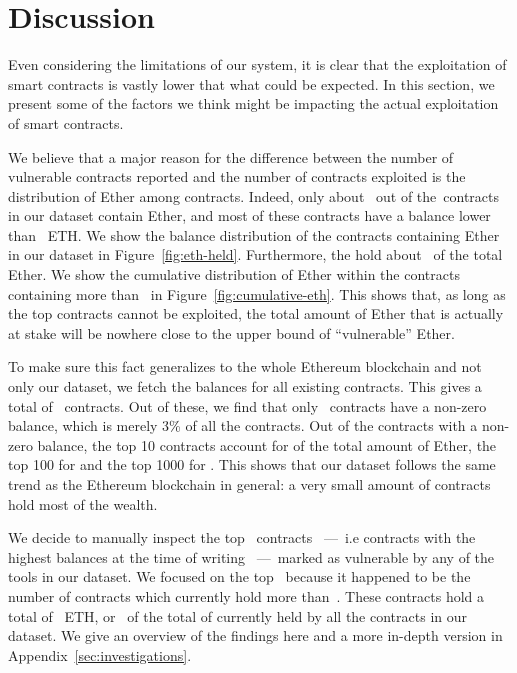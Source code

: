\section{Discussion}
\label{sec:discussion}

Even considering the limitations of our system, it is clear that the exploitation of smart contracts is vastly lower that what could be expected. In this section, we present some of the factors we think might be impacting the actual exploitation of smart contracts.


We believe that a major reason for the difference between the number of vulnerable contracts reported and the number of contracts exploited is the distribution of Ether among contracts. Indeed, only about~ out of the~\VulnerableContracts contracts in our dataset contain Ether, and most of these contracts have a balance lower than~ ETH. We show the balance distribution of the contracts containing Ether in our dataset in Figure~\ref{fig:eth-held}. Furthermore, the  hold about~ of the total Ether. We show the cumulative distribution of Ether within the contracts containing more than~ in Figure~\ref{fig:cumulative-eth}. This shows that, as long as the top contracts cannot be exploited, the total amount of Ether that is actually at stake will be nowhere close to the upper bound of ``vulnerable'' Ether.

To make sure this fact generalizes to the whole Ethereum blockchain and not only our dataset, we fetch the balances for all existing contracts. This gives a total of~ contracts. Out of these, we find that only~ contracts have a non-zero balance, which is merely 3\% of all the contracts. Out of the contracts with a non-zero balance, the top 10 contracts account for  of the total amount of Ether, the top 100 for  and the top 1000 for . This shows that our dataset follows the same trend as the Ethereum blockchain in general: a very small amount of contracts hold most of the wealth.

We decide to manually inspect the top~ contracts~ ---~i.e contracts with the highest balances at the time of writing~ ---~marked as vulnerable by any of the tools in our dataset. We focused on the top~ because it happened to be the number of contracts which currently hold more than~. These contracts hold a total of~ ETH, or~ of the total of  currently held by all the contracts in our dataset. We give an overview of the findings here and a more in-depth version in Appendix~\ref{sec:investigations}.

